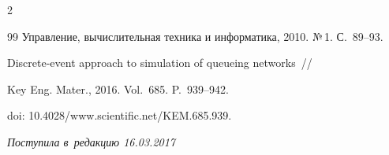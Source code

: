 \begin{multicols}{2}
{{\begin{thebibliography}{99}
Управление, вычислительная техника и информатика, 2010. №\,1. С.~89--93.









Discrete-event approach to simulation of queueing networks~// 


Key Eng. Mater., 2016. Vol.~685. P.~939--942.


doi: 10.4028/www.scientific.net/KEM.685.939.





\end{thebibliography}


} }





\end{multicols}





 \label{end\stat}





 \vspace*{-3pt}





\hfill{\small\textit{Поступила в~редакцию  16.03.2017}}




\renewcommand{\figurename}{\protect\bf Рис.}


\renewcommand{\tablename}{\protect\bf Таблица} 


